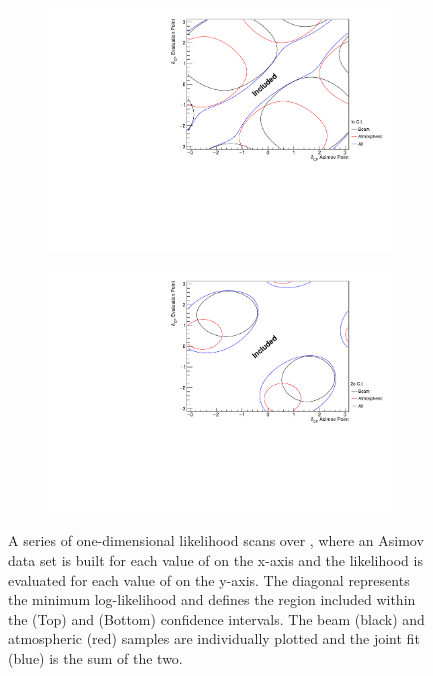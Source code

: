 
\begin{figure}[h]
  \begin{subfigure}[t]{1.0\textwidth}
    \includegraphics[width=\textwidth, trim={0mm 0mm 0mm 0mm}, clip,page=1]{Figures/OA/DCP_Scans_1Sig.pdf}
  \end{subfigure}
  \begin{subfigure}[t]{1.0\textwidth}
    \includegraphics[width=\textwidth, trim={0mm 0mm 0mm 0mm}, clip,page=1]{Figures/OA/DCP_Scans_2Sig.pdf}
  \end{subfigure}
  \caption{A series of one-dimensional likelihood scans over , where an Asimov data set is built for each value of  on the x-axis and the likelihood is evaluated for each value of  on the y-axis. The diagonal represents the minimum log-likelihood and defines the region included within the \quickmath{1\sigma} (Top) and \quickmath{2\sigma} (Bottom) confidence intervals. The beam (black) and atmospheric (red) samples are individually plotted and the joint fit (blue) is the sum of the two.}
  \label{fig:OscillationAnalysis_AsimovEval_DCP}
\end{figure}

